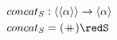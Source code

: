 \documentclass[preview]{standalone}
\begin{document}
\begin{align*}
  concat_S &: \vect{\vect{\alpha}} \rightarrow \vect{\alpha} \\
  concat_S & = (\fcat) \redS
\end{align*}
\end{document}
